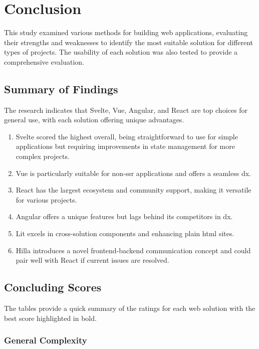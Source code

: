 \chapter{Conclusion}

This study examined various methods for building web applications, evaluating their strengths and weaknesses to identify the most suitable solution for different types of projects. The usability of each solution was also tested to provide a comprehensive evaluation.

\section{Summary of Findings}

The research indicates that Svelte, Vue, Angular, and React are top choices for general use, with each solution offering unique advantages.

\begin{enumerate}
    \item Svelte scored the highest overall, being straightforward to use for simple applications but requiring improvements in state management for more complex projects.
    \item Vue is particularly suitable for non-\acrshort{ssr} applications and offers a seamless \acrshort{dx}.
    \item React has the largest ecosystem and community support, making it versatile for various projects.
    \item Angular offers a unique features but lags behind its competitors in \acrshort{dx}.
    \item Lit excels in cross-solution components and enhancing plain \acrshort{html} sites.
    \item Hilla introduces a novel frontend-backend communication concept and could pair well with React if current issues are resolved.
\end{enumerate}

\section{Concluding Scores}

The tables provide a quick summary of the ratings for each web solution with the best score highlighted in bold.

\subsection{General Complexity}

